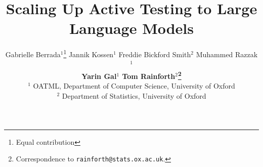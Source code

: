 \documentclass{article}
\title{Scaling Up Active Testing to Large Language Models}
\author{%
    Gabrielle Berrada$^{1}$\thanks{Equal contribution}
    \phantom{1}
    Jannik Kossen$^{1}$\footnotemark[1]
    \phantom{1}
    Freddie Bickford Smith$^{2}$
    \phantom{1}
    Muhammed Razzak$^{1}$\\[0.5em]
    \textbf{
    \phantom{1}
    Yarin Gal$^{1}$ 
    \phantom{1}
    Tom Rainforth$^{2}$\thanks{Correspondence to \texttt{rainforth@stats.ox.ac.uk}.}}
    \\[1em]
    $^1$ OATML, Department of Computer Science, University of Oxford \\
    $^2$ Department of Statistics, University of Oxford
    \vspace{-1em}
}
\theoremstyle{plain}
\theoremstyle{definition}
\theoremstyle{remark}
\begin{document}
\raggedbottom

\maketitle













\clearpage


\clearpage
\appendix




\end{document}
